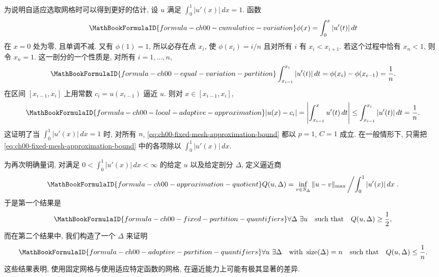 为说明自适应选取网格时可以得到更好的估计, 设 $u$ 满足 $\int_0^1|u'(x)|\,dx=1$. 函数
\begin{equation}
\MathBookFormulaID{formula-ch00-cumulative-variation}
\phi(x)=\int_0^x|u'(t)|\,dt
\label{eq:ch00-cumulative-variation}
\end{equation}
在 $x=0$ 处为零, 且单调不减. 又有 $\phi(1)=1$, 所以必存在点 $x_i$, 使 $\phi(x_i)=i/n$ 且对所有 $i$ 有 $x_i<x_{i+1}$. 若这个过程中恰有 $x_n<1$, 则令 $x_n=1$. 这一剖分的一个性质是, 对所有 $i=1,\ldots,n$,
\begin{equation}
\MathBookFormulaID{formula-ch00-equal-variation-partition}
\int_{x_{i-1}}^{x_i}|u'(t)|\,dt
=\phi(x_i)-\phi(x_{i-1})=\frac1n.
\label{eq:ch00-equal-variation-partition}
\end{equation}
在区间 $[x_{i-1},x_i]$ 上用常数 $c_i=u(x_{i-1})$ 逼近 $u$. 则对 $x\in[x_{i-1},x_i]$,
\setcounter{equation}{2}
\begin{equation}
\MathBookFormulaID{formula-ch00-local-adaptive-approximation}
|u(x)-c_i|
=\left|\int_{x_{i-1}}^xu'(t)\,dt\right|
\leq\int_{x_{i-1}}^{x_i}|u'(t)|\,dt
=\frac1n.
\label{eq:ch00-local-adaptive-approximation}
\end{equation}
这证明了当 $\int_0^1|u'(x)|\,dx=1$ 时, 对所有 $n$, \eqref{eq:ch00-fixed-mesh-approximation-bound} 都以 $p=1$, $C=1$ 成立. 在一般情形下, 只需把 \eqref{eq:ch00-fixed-mesh-approximation-bound} 中的各项除以 $\int_0^1|u'(x)|\,dx$.

为再次明确量词, 对满足 $0<\int_0^1|u'(x)|\,dx<\infty$ 的给定 $u$ 以及给定剖分 $\Delta$, 定义逼近商
\setcounter{equation}{4}
\begin{equation}
\MathBookFormulaID{formula-ch00-approximation-quotient}
Q(u,\Delta)=
\inf_{v\in S_\Delta}\|u-v\|_{\max}
\left/\int_0^1|u'(x)|\,dx\right. .
\label{eq:ch00-approximation-quotient}
\end{equation}
于是第一个结果是
\begin{equation}
\MathBookFormulaID{formula-ch00-fixed-partition-quantifiers}
\forall\Delta\ \exists u\quad\text{such that}\quad Q(u,\Delta)\geq\frac12,
\label{eq:ch00-fixed-partition-quantifiers}
\end{equation}
而在第二个结果中, 我们构造了一个 $\Delta$ 来证明
\begin{equation}
\MathBookFormulaID{formula-ch00-adaptive-partition-quantifiers}
\forall u\ \exists\Delta\quad\text{with }\operatorname{size}(\Delta)=n
\quad\text{such that}\quad Q(u,\Delta)\leq\frac1n.
\label{eq:ch00-adaptive-partition-quantifiers}
\end{equation}
这些结果表明, 使用固定网格与使用适应特定函数的网格, 在逼近能力上可能有极其显著的差异.


